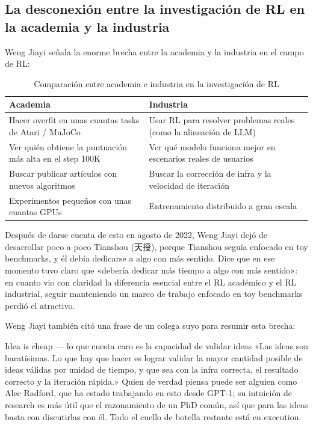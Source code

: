 \subsection{La desconexión entre la investigación de RL en la academia y la industria}

Weng Jiayi señala la enorme brecha entre la academia y la industria en el campo de RL:

\begin{table}[H]
\centering
\begin{tabular}{ll}
\toprule
\textbf{Academia} & \textbf{Industria} \\
\midrule
Hacer overfit en unas cuantas tasks de Atari / MuJoCo & Usar RL para resolver problemas reales (como la alineación de LLM) \\
Ver quién obtiene la puntuación más alta en el step 100K & Ver qué modelo funciona mejor en escenarios reales de usuarios \\
Buscar publicar artículos con nuevos algoritmos & Buscar la corrección de infra y la velocidad de iteración \\
Experimentos pequeños con unas cuantas GPUs & Entrenamiento distribuido a gran escala \\
\bottomrule
\end{tabular}
\caption{Comparación entre academia e industria en la investigación de RL}
\end{table}

Después de darse cuenta de esto en agosto de 2022, Weng Jiayi dejó de desarrollar poco a poco Tianshou (天授), porque Tianshou seguía enfocado en toy benchmarks, y él debía dedicarse a algo con más sentido. Dice que en ese momento tuvo claro que «debería dedicar más tiempo a algo con más sentido»: en cuanto vio con claridad la diferencia esencial entre el RL académico y el RL industrial, seguir manteniendo un marco de trabajo enfocado en toy benchmarks perdió el atractivo.

Weng Jiayi también citó una frase de un colega suyo para resumir esta brecha:

\begin{importantbox}{Idea is cheap --- lo que cuesta caro es la capacidad de validar ideas}
«Las ideas son baratísimas. Lo que hay que hacer es lograr validar la mayor cantidad posible de ideas válidas por unidad de tiempo, y que sea con la infra correcta, el resultado correcto y la iteración rápida.» Quien de verdad piensa puede ser alguien como Alec Radford, que ha estado trabajando en esto desde GPT-1; su intuición de research es más útil que el razonamiento de un PhD común, así que para las ideas basta con discutirlas con él. Todo el cuello de botella restante está en execution.
\end{importantbox}

